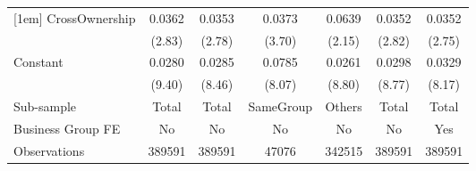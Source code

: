 {\begin{tabular}{l*{6}{c}}
[1em]
CrossOwnership  &   0.0362\sym{**} &   0.0353\sym{**} &   0.0373\sym{***}&   0.0639\sym{*}  &   0.0352\sym{**} &   0.0352\sym{**} \\
                &   (2.83)         &   (2.78)         &   (3.70)         &   (2.15)         &   (2.82)         &   (2.75)         \\
[1em]
Constant        &   0.0280\sym{***}&   0.0285\sym{***}&   0.0785\sym{***}&   0.0261\sym{***}&   0.0298\sym{***}&   0.0329\sym{***}\\
                &   (9.40)         &   (8.46)         &   (8.07)         &   (8.80)         &   (8.77)         &   (8.17)         \\
\hline
Sub-sample      &    Total         &    Total         &SameGroup         &   Others         &    Total         &    Total         \\
Business Group FE&       No         &       No         &       No         &       No         &       No         &      Yes         \\
Observations    &   389591         &   389591         &    47076         &   342515         &   389591         &   389591         \\
\hline\hline  \end{tabular}}
